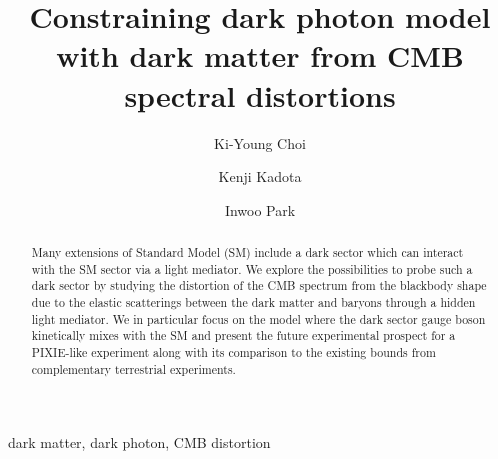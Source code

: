 \documentclass[5p,times]{elsarticle}
\begin{document}
\begin{frontmatter}


\title{Constraining dark photon model with dark matter from CMB spectral distortions}

\author[CNU]{Ki-Young Choi}


\author[CTPU]{Kenji Kadota}


\author[KAIST,CTPU]{Inwoo Park}

\address[CNU]{Institute for Universe and Elementary Particles and Department of Physics, Chonnam National University, 77 Yongbong-ro, Buk-gu, Gwangju, 61186, Republic of Korea}
\address[CTPU]{Center for Theoretical Physics of the Universe,
Institute for Basic Science (IBS), Daejeon, 34051, Korea}
\address[KAIST]{Department of Physics, Korea Advanced Institute of Science and Technology, Daejeon, 34141,Republic of Korea}


\begin{abstract}
  Many extensions of Standard Model (SM) include a dark sector which can interact with the SM sector via a light mediator. We explore the possibilities to probe such a dark sector by studying the distortion of the CMB spectrum from the blackbody shape due to the elastic scatterings between the dark matter and baryons through a hidden light mediator. We in particular focus on the model where the dark sector gauge boson kinetically mixes with the SM and present the future experimental prospect for a PIXIE-like experiment along with its comparison to the existing bounds from complementary terrestrial experiments.
  
\end{abstract}

\begin{keyword}
dark matter, dark photon, CMB distortion
\end{keyword}

\end{frontmatter}

\end{document}
